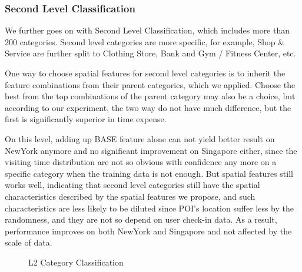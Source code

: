 \subsubsection{Second Level Classification}
We further goes on with Second Level Classification, which includes more than 200 categories. Second level categories are more specific, for example, Shop \& Service are further split to Clothing Store, Bank and Gym / Fitness Center, etc.

One way to choose spatial features for second level categories is to inherit the feature combinations from their parent categories, which we applied. Choose the best from the top combinations of the parent category may also be a choice, but according to our experiment, the two way do not have much difference, but the first is significantly superior in time expense.

On this level, adding up BASE feature alone can not yield better result on NewYork anymore and no significant improvement on Singapore either, since the visiting time distribution are not so obvious with confidence any more on a specific category when the training data is not enough. But spatial features still works well, indicating that second level categories still have the spatial characteristics described by the spatial features we propose, and such characteristics are less likely to be diluted since POI's location suffer less by the randomness, and they are not so depend on user check-in data. As a result, performance improves on both NewYork and Singapore and not affected by the scale of data.


\begin{figure}[h]
\centering
\hspace{-3cm}
\hspace{-3cm}
\hspace{-3cm}
\caption{L2 Category Classification}
\end{figure}
